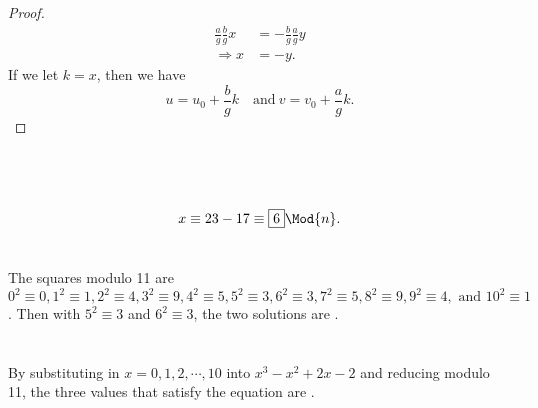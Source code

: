 \documentclass[
  coursecode={MTHE 418},
  assignmentname={Homework \homeworknumber},
  studentnumber=20053722,
  name={Bryan Hoang},
  draft,
  final,
]{
  ltxanswer%
}
\begin{document}
\begin{questions}
\begin{parts}
\begin{solution}
\begin{proof}
          \begin{align*}
            \frac{a}{g}\frac{b}{g}x &= -\frac{b}{g}\frac{a}{g}y \\
            \Rightarrow x           &= -y.
          \end{align*}
          If we let \(k = x\), then we have
          \begin{equation*}
            u = u_{0} + \frac{b}{g}k \quad \text{and}\ v = v_{0} + \frac{a}{g}k.
          \end{equation*}
        \end{proof}
      \end{solution}
    \end{parts}

    \question\
    \begin{parts}
      \part{}
      \begin{solution}
        \begin{equation*}
          x \equiv 23 - 17 \equiv \boxed{6} \Mod{n}.
        \end{equation*}
      \end{solution}

      \addtocounter{partno}{1}

      \part{}
      \begin{solution}
        The squares modulo 11 are \(0^{2} \equiv 0, 1^{2} \equiv 1, 2^{2} \equiv 4, 3^{2} \equiv 9, 4^{2} \equiv 5, 5^{2} \equiv 3, 6^{2} \equiv 3, 7^{2} \equiv 5, 8^{2} \equiv 9, 9^{2} \equiv 4, \text{ and } 10^{2} \equiv 1\). Then with \(5^{2} \equiv 3\) and \(6^{2} \equiv 3\), the two solutions are .
      \end{solution}

      \addtocounter{partno}{2}

      \part{}
      \begin{solution}
        By substituting in \(x = 0, 1, 2, \cdots, 10\) into \(x^{3} - x^{2} + 2x - 2\) and reducing modulo 11, the three values that satisfy the equation are .
      \end{solution}


\end{parts}
\end{questions}
\end{document}
